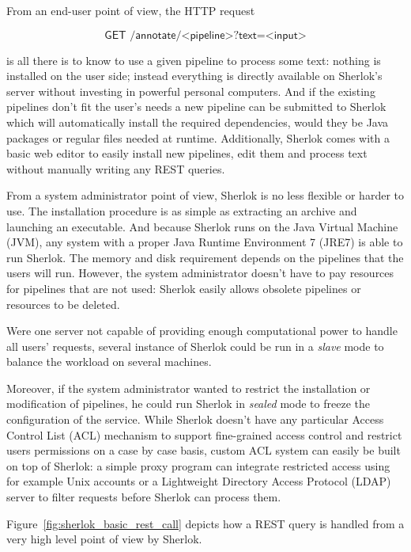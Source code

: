 \documentclass{article}
\newcommand{\REST}[1]{\textsf{#1}}
\begin{document}
From an end-user point of view, the HTTP request

\[
    \REST{GET /annotate/<pipeline>?text=<input>}
\]

is all there is to know to use a given pipeline to process some text: nothing is installed on the
user side; instead everything is directly available on Sherlok's server without investing in
powerful personal computers. And if the existing pipelines don't fit the user's needs a new pipeline
can be submitted to Sherlok which will automatically install the required dependencies, would they
be Java packages or regular files needed at runtime. Additionally, Sherlok comes with a basic web
editor to easily install new pipelines, edit them and process text without manually writing any REST
queries.

From a system administrator point of view, Sherlok is no less flexible or harder to use. The
installation procedure is as simple as extracting an archive and launching an executable. And
because Sherlok runs on the Java Virtual Machine (JVM), any system with a proper Java Runtime
Environment 7 (JRE7) is able to run Sherlok. The memory and disk requirement depends on the
pipelines that the users will run. However, the system administrator doesn't have to pay resources
for pipelines that are not used: Sherlok easily allows obsolete pipelines or resources to be
deleted.

Were one server not capable of providing enough computational power to handle all users' requests,
several instance of Sherlok could be run in a \emph{slave} mode to balance the workload on several
machines.

Moreover, if the system administrator wanted to restrict the installation or modification of
pipelines, he could run Sherlok in \emph{sealed} mode to freeze the configuration of the service.
While Sherlok doesn't have any particular Access Control List (ACL) mechanism to support
fine-grained access control and restrict users permissions on a case by case basis, custom ACL
system can easily be built on top of Sherlok: a simple proxy program can integrate restricted access
using for example Unix accounts or a Lightweight Directory Access Protocol (LDAP) server to filter
requests before Sherlok can process them.

Figure~\ref{fig:sherlok_basic_rest_call} depicts how a REST query is handled from a very high level
point of view by Sherlok.
\end{document}
